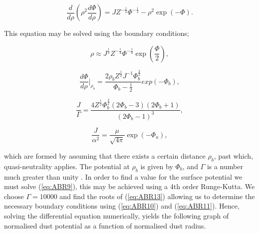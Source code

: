 \documentclass{article}
\begin{document}
\begin{equation}\label{eq:ABR9} 
\frac{d}{d\rho} \left(\rho^2 \frac{d\Phi}{d\rho}\right) = J Z^{-\frac{1}{2}}\Phi^{-\frac{1}{2}}  - \rho^2 \exp{(-\Phi)}.
\end{equation}

\medskip

\noindent This equation may be solved using the boundary conditions;

\begin{equation}\label{eq:ABR10}
\rho \approx J^{\frac{1}{2}} Z^{-\frac{1}{4}} \Phi^{-\frac{1}{4}} \exp{\left(\frac{\Phi}{2}\right)},
\end{equation}
 
\begin{equation}\label{eq:ABR11}
\frac{d\Phi}{d\rho}\biggr|_{\rho_b} = \frac{2\rho_b Z^{\frac{1}{2}} J^{-1} \Phi_b^{\frac{3}{2}}}{\Phi_b - \frac{1}{2}} exp{(-\Phi_b)},
\end{equation}
 
\begin{equation}\label{eq:ABR13}
\frac{J}{\Gamma} = \frac{4Z^{\frac{1}{2}}\Phi_b^{\frac{3}{2}}(2\Phi_b - 3)(2\Phi_b + 1)}{(2\Phi_b - 1)^3},
\end{equation}

\begin{equation}\label{eq:ABR12}
\frac{J}{\alpha^2} = \frac{\mu}{\sqrt{4\pi}} \exp{\left(-\Phi_a\right)},
\end{equation}

\medskip

\noindent which are formed by assuming that there exists a certain distance $\rho_b$, past which, quasi-neutrality applies. 
The potential at $\rho_b$ is given by $\Phi_b$, and $\Gamma$ is a number much greater than unity \cite{ABR}.
In order to find a value for the surface potential we must solve (\ref{eq:ABR9}), this may be 
achieved using a 4th order Runge-Kutta. We choose $\Gamma = 10000$ and find the roots of 
(\ref{eq:ABR13}) allowing us to determine the necessary boundary conditions 
using (\ref{eq:ABR10}) and (\ref{eq:ABR11}). Hence, solving the differential equation numerically, yields 
the following graph of normalised dust potential as a function of normalised dust radius.
\end{document}
